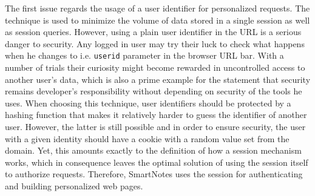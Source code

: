 \begin{itemize}
{The first issue regards the usage of a user identifier for personalized requests. The technique is used to minimize the volume of data stored in a single session as well as session queries. However, using a plain user identifier in the URL is a serious danger to security. Any logged in user may try their luck to check what happens when he changes to i.e. \texttt{userid} parameter in the browser URL bar. With a number of trials their curiosity might become rewarded in uncontrolled access to another user’s data, which is also a prime example for the statement that security remains developer’s responsibility without depending on security of the tools he uses. When choosing this technique, user identifiers should be protected by a hashing function that makes it relatively harder to guess the identifier of another user. However, the latter is still possible and in order to ensure security, the user with a given identity should have a cookie with a random value set from the domain. Yet, this amounts exactly to the definition of how a session mechanism works, which in consequence leaves the optimal solution of using the session itself to authorize requests. Therefore, SmartNotes uses the session for authenticating and building personalized web pages.   
 
}
\end{itemize}
